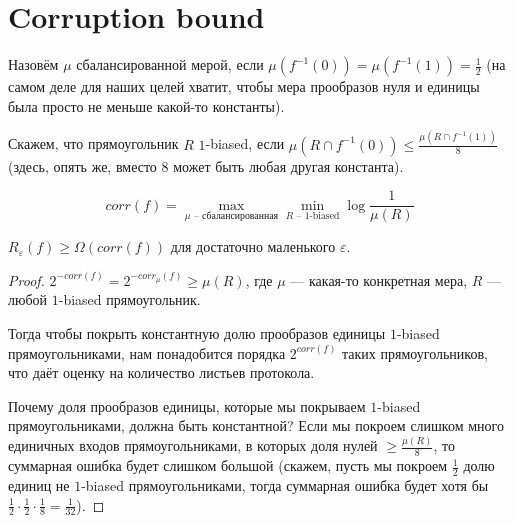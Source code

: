 \section{Corruption bound}

Назовём $\mu$ сбалансированной мерой, если $\mu(f^{-1}(0)) = \mu(f^{-1}(1)) = \frac{1}{2}$ (на самом деле для наших целей хватит, чтобы мера прообразов нуля и единицы была просто не меньше какой-то константы).

Скажем, что прямоугольник $R$ $1$-biased, если $\mu(R \cap f^{-1}(0)) \leq \frac{\mu(R \cap f^{-1}(1))}{8}$ (здесь, опять же, вместо $8$ может быть любая другая константа).

$$corr(f) = \max_{\mu \text{~-- сбалансированная}} \min_{R \text{~-- 1-biased}} \log{\frac{1}{\mu(R)}}$$

\begin{lemma}
$R_{\varepsilon}(f) \geq \Omega(corr(f))$ для достаточно маленького $\varepsilon$.
\end{lemma}

\begin{proof}
$2^{-corr(f)} = 2^{-corr_{\mu}(f)} \geq \mu(R)$, где $\mu$ --- какая-то конкретная мера, $R$ --- любой $1$-biased прямоугольник.

Тогда чтобы покрыть константную долю прообразов единицы $1$-biased прямоугольниками, нам понадобится порядка $2^{corr(f)}$ таких прямоугольников, что даёт оценку на количество листьев протокола.

Почему доля прообразов единицы, которые мы покрываем $1$-biased прямоугольниками, должна быть константной? Если мы покроем слишком много единичных входов прямоугольниками, в которых доля нулей $\geq \frac{\mu(R)}{8}$, то суммарная ошибка будет слишком большой (скажем, пусть мы покроем $\frac{1}{2}$ долю единиц не $1$-biased прямоугольниками, тогда суммарная ошибка будет хотя бы $\frac{1}{2} \cdot \frac{1}{2} \cdot \frac{1}{8} = \frac{1}{32}$).

\end{proof}
